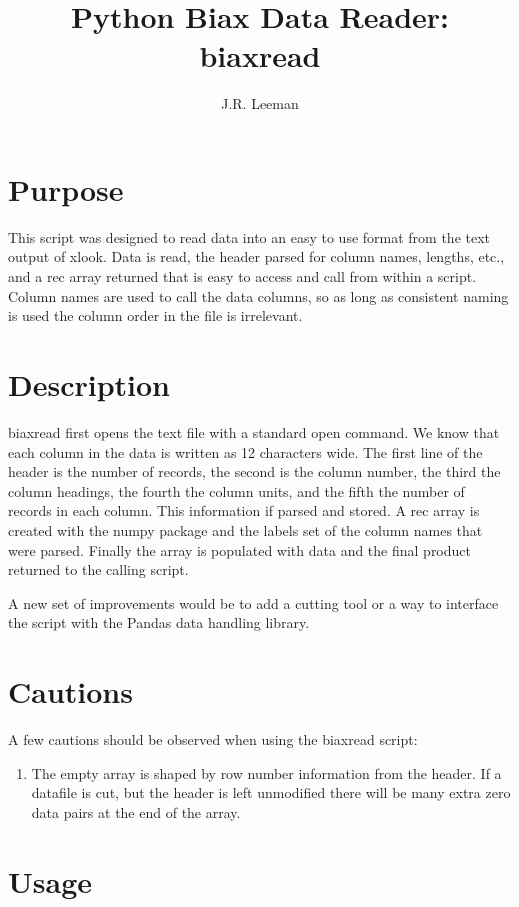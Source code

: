 \documentclass[a4paper,11pt,oneside]{article}
\author{ J.R. Leeman}
\title{Python Biax Data Reader: biaxread}
\begin{document}
\maketitle
\newpage

\section{Purpose}
This script was designed to read data into an easy to use format from the text output of xlook.  Data is read, the header parsed for column names, lengths, etc., and a rec array returned that is easy to access and call from within a script.  Column names are used to call the data columns, so as long as consistent naming is used the column order in the file is irrelevant.

\section{Description}

biaxread first opens the text file with a standard open command.  We know that each column in the data is written as 12 characters wide.  The first line of the header is the number of records, the second is the column number, the third the column headings, the fourth the column units, and the fifth the number of records in each column.  This information if parsed and stored.  A rec array is created with the numpy package and the labels set of the column names that were parsed.  Finally the array is populated with data and the final product returned to the calling script.

A new set of improvements would be to add a cutting tool or a way to interface the script with the Pandas data handling library.

\section{Cautions}
A few cautions should be observed when using the biaxread script:

\begin{enumerate}
\item The empty array is shaped by row number information from the header.  If a datafile is cut, but the header is left unmodified there will be many extra zero data pairs at the end of the array.
\end{enumerate}

\section{Usage}
\end{document}
